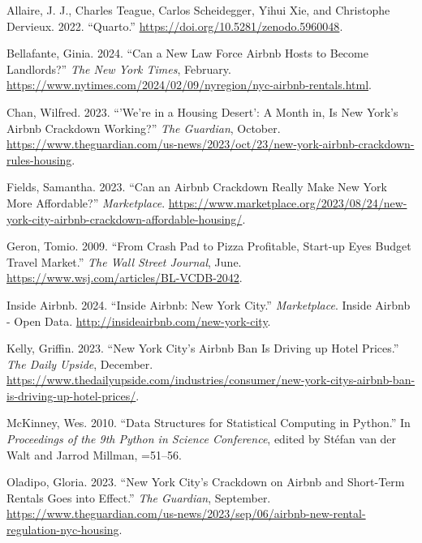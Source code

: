 \documentclass[
  letterpaper,
  DIV=11,
  numbers=noendperiod]{scrartcl}
\newlength{\cslhangindent}
\newenvironment{CSLReferences}[2] %
 {\begin{list}{}{%
  \setlength{\itemindent}{0pt}
  \setlength{\leftmargin}{0pt}
  \setlength{\parsep}{0pt}
  \ifodd #1
   \setlength{\leftmargin}{\cslhangindent}
   \setlength{\itemindent}{-1\cslhangindent}
  \fi
  \setlength{\itemsep}{#2\baselineskip}}}
 {\end{list}}
\begin{document}
\label{refs}
\begin{CSLReferences}{1}{0}
Allaire, J. J., Charles Teague, Carlos Scheidegger, Yihui Xie, and
Christophe Dervieux. 2022. {``{Quarto}.''}
\url{https://doi.org/10.5281/zenodo.5960048}.

Bellafante, Ginia. 2024. {``Can a New Law Force Airbnb Hosts to Become
Landlords?''} \emph{The New York Times}, February.
\url{https://www.nytimes.com/2024/02/09/nyregion/nyc-airbnb-rentals.html}.

Chan, Wilfred. 2023. {``'We're in a Housing Desert': A Month in, Is New
York's Airbnb Crackdown Working?''} \emph{The Guardian}, October.
\url{https://www.theguardian.com/us-news/2023/oct/23/new-york-airbnb-crackdown-rules-housing}.

Fields, Samantha. 2023. {``Can an Airbnb Crackdown Really Make New York
More Affordable?''} \emph{Marketplace}.
\url{https://www.marketplace.org/2023/08/24/new-york-city-airbnb-crackdown-affordable-housing/}.

Geron, Tomio. 2009. {``From Crash Pad to Pizza Profitable, Start-up Eyes
Budget Travel Market.''} \emph{The Wall Street Journal}, June.
\url{https://www.wsj.com/articles/BL-VCDB-2042}.

Inside Airbnb. 2024. {``Inside Airbnb: New York City.''}
\emph{Marketplace}. Inside Airbnb - Open Data.
\url{http://insideairbnb.com/new-york-city}.

Kelly, Griffin. 2023. {``New York City's Airbnb Ban Is Driving up Hotel
Prices.''} \emph{The Daily Upside}, December.
\url{https://www.thedailyupside.com/industries/consumer/new-york-citys-airbnb-ban-is-driving-up-hotel-prices/}.

McKinney, Wes. 2010. {``Data Structures for Statistical Computing in
Python.''} In \emph{Proceedings of the 9th Python in Science
Conference}, edited by Stéfan van der Walt and Jarrod Millman, =51--56.

Oladipo, Gloria. 2023. {``New York City's Crackdown on Airbnb and
Short-Term Rentals Goes into Effect.''} \emph{The Guardian}, September.
\url{https://www.theguardian.com/us-news/2023/sep/06/airbnb-new-rental-regulation-nyc-housing}.


\end{CSLReferences}
\end{document}
